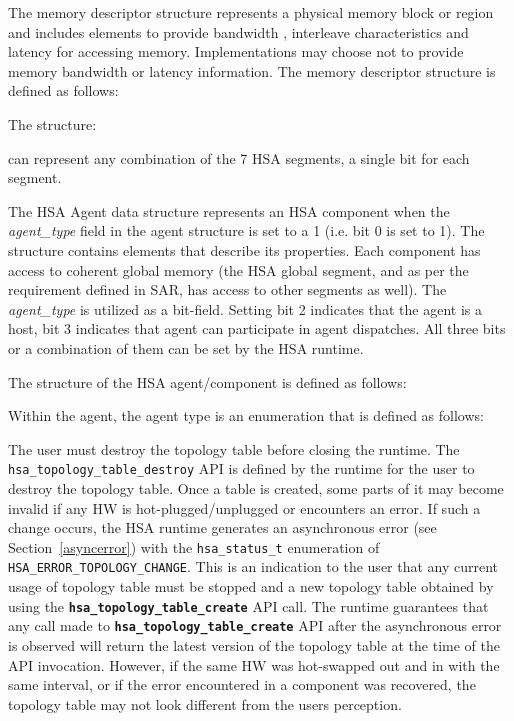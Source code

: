 \documentclass{book}
\newcommand{\diffblock}[1]{#1}
\newcommand{\ttbf}[1]{\diffblock{\texttt{\textbf{#1}}}}
\newcommand{\dbtt}[1]{\diffblock{\texttt{#1}}}
\begin{document}
The memory descriptor structure represents a physical memory block
or region and includes elements to provide bandwidth
, interleave
characteristics and latency for accessing memory. Implementations
may choose not to provide memory bandwidth or latency information.
The memory descriptor structure is defined as follows:



The structure:

can represent any combination of the 7 HSA segments, a single
bit for each segment.

The HSA Agent data structure represents an HSA component when the
{\itshape agent\_type} field in the agent structure is set to a 1
(i.e. bit 0 is set to 1).
The structure contains elements that describe its properties. Each
component has access to coherent global memory (the HSA global
segment, and as per the requirement defined in SAR, has access to
other segments as well). The {\itshape agent\_type} is utilized as a
bit-field. Setting bit 2 indicates that the agent is a host, bit 3
indicates that agent can participate in agent dispatches. All
three bits or a combination of them can be set by the HSA runtime.

The structure of the HSA agent/component is defined as follows:


Within the agent, the agent type is an enumeration that is defined
as follows:


The user must destroy the topology table before closing the runtime.
The \dbtt{hsa\_topology\_table\_destroy} API is defined by the
runtime for the user to destroy the topology table. Once a table is
created, some parts of it may become invalid if any HW is
hot-plugged/unplugged or encounters an error. If such a change
occurs, the HSA runtime generates an asynchronous error (see
Section~\ref{asyncerror}) with the \dbtt{hsa\_status\_t} enumeration
of \dbtt{HSA\_ERROR\_TOPOLOGY\_CHANGE}. This is an indication to the
user that any current usage of topology table must be stopped and a
new topology table obtained by using the
\ttbf{hsa\_topology\_table\_create} API call. The runtime guarantees
that any call made to \ttbf{hsa\_topology\_table\_create} API after
the asynchronous error is observed will return the latest version of
the topology table at the time of the API invocation. However, if
the same HW was hot-swapped out and in with the same interval, or if
the error encountered in a component was recovered, the topology
table may not look different from the users perception.
\end{document}
